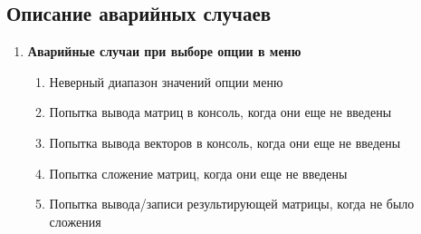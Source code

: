 	\subsection{Описание аварийных случаев}
	\begin{enumerate}
		\item\textbf{Аварийные случаи при выборе опции в меню}
		\begin{enumerate}
			\item Неверный диапазон значений опции меню
			\item Попытка вывода матриц в консоль, когда они еще не введены
			\item Попытка вывода векторов в консоль, когда они еще не введены
			\item Попытка сложение матриц, когда они еще не введены
			\item Попытка вывода/записи результирующей матрицы, когда не было сложения
		\end{enumerate}


\end{enumerate}
